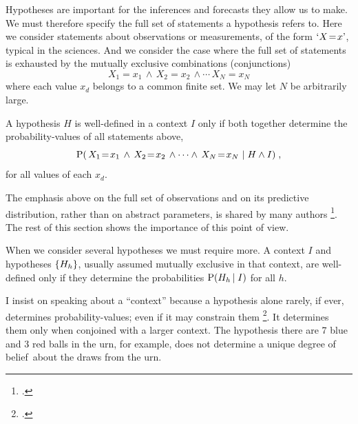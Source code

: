 \documentclass[\ifafour a4paper,12pt,\else a5paper,10pt,\fi%
onecolumn,oneside,article,%
british%
]{memoir}
\theoremstyle{remark}
\theoremstyle{innote}
\newcommand*{\citep}{\footcites}
\DeclarePairedDelimiter\set{\{}{\}}
\newcommand*{\p}{\mathrm{P}}%
\renewcommand*{\|}[1][]{\nonscript\,#1\vert\nonscript\;\mathopen{}}
\newcommand*{\eg}{{e.g.}}
\newcommand*{\prop}[1]{\text{\textquoteleft}#1\text{\textquoteright}}
\newcommand*{\propf}[1]{\,#1\,}
\newcommand*{\dob}{degree of belief}
\newcommand*{\yK}{I}
\newcommand*{\eq}{\mathrel{\!=\!}}
\begin{document}
\medskip

Hypotheses are important for the inferences and forecasts they allow us to
make. We must therefore specify the full set of statements a hypothesis
refers to. Here we consider statements about observations or measurements,
of the form $\prop{X \eq x}$, typical in the sciences. And we consider the
case where the full set of statements is exhausted by the mutually
exclusive combinations (conjunctions)
\begin{equation}
  \label{eq:statements_interested}
  \propf{X_{1}\eq x_{1}} \land
  \propf{X_{2}\eq x_{2}} \land \dotsb
  \propf{X_{N}\eq x_{N}}
\end{equation}
where each value $x_{d}$ belongs to a common finite set. We may let $N$ be
arbitrarily large.

A hypothesis $H$ is well-defined in a context $\yK$ only if both together
determine the probability-values of all statements above,
\begin{equation}
  \label{eq:prob_stat_from_hyp}
  \p( \propf{X_{1}\eq x_{1}} \land
  \propf{X_{2}\eq x_{2}} \land \dotsb \land
  \propf{X_{N}\eq x_{N}} \| H \land \yK) \;,
\end{equation}
for all values of each $x_{d}$.

The emphasis above on the full set of observations and on its predictive
distribution, rather than on abstract parameters, is shared by many authors
\citep[\eg][]{definetti1930,definetti1937,roberts1965,lauritzen1974,diaconis1988,bernardoetal1994_r2000,fortinietal2000,fortinietal2012}[see
also][]{mccullagh2002}. The rest of this section shows the importance of
this point of view.

When we consider several hypotheses we must require more. A context $\yK$
and hypotheses $\set{H_{h}}$, usually assumed mutually exclusive in that
context, are well-defined only if they determine the probabilities
$\p( H_{h} \| \yK)$ for all $h$.

I insist on speaking about a \enquote{context} because a hypothesis alone
rarely, if ever, determines probability-values; even if it may constrain
them \citep{hailperin2011}. It determines them only when conjoined with a
larger context. The hypothesis \prop{there are 7 blue and 3 red balls in the
  urn}, for example, does not determine a unique \dob\ about the draws from
the urn.
\end{document}
